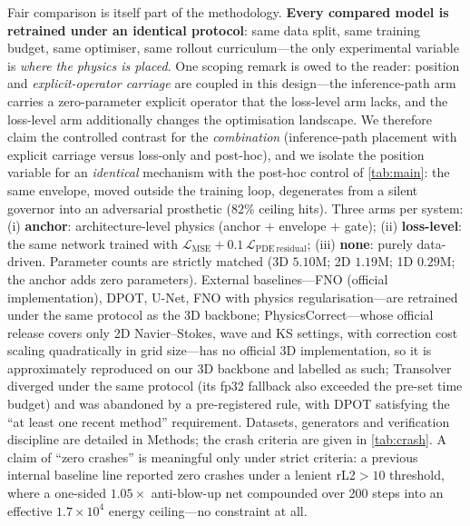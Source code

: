 \documentclass[11pt,a4paper]{article}
\begin{document}
Fair comparison is itself part of the methodology. \textbf{Every compared model is retrained under an identical protocol}: same data split, same training budget, same optimiser, same rollout curriculum---the only experimental variable is \emph{where the physics is placed}. One scoping remark is owed to the reader: position and \emph{explicit-operator carriage} are coupled in this design---the inference-path arm carries a zero-parameter explicit operator that the loss-level arm lacks, and the loss-level arm additionally changes the optimisation landscape. We therefore claim the controlled contrast for the \emph{combination} (inference-path placement with explicit carriage versus loss-only and post-hoc), and we isolate the position variable for an \emph{identical} mechanism with the post-hoc control of \ref{tab:main}: the same envelope, moved outside the training loop, degenerates from a silent governor into an adversarial prosthetic ($82\%$ ceiling hits). Three arms per system: (i) \textbf{anchor}: architecture-level physics (anchor $+$ envelope $+$ gate); (ii) \textbf{loss-level}: the same network trained with $\mathcal{L}_{\mathrm{MSE}}+0.1\,\mathcal{L}_{\mathrm{PDE\ residual}}$; (iii) \textbf{none}: purely data-driven. Parameter counts are strictly matched (3D $5.10$M; 2D $1.19$M; 1D $0.29$M; the anchor adds zero parameters). External baselines---FNO (official implementation\cite{kossaifi2024library}), DPOT\cite{hao2024dpot}, U-Net\cite{ronneberger2015}, FNO with physics regularisation---are retrained under the same protocol as the 3D backbone; PhysicsCorrect\cite{huang2025physicorrect}---whose official release covers only 2D Navier--Stokes, wave and KS settings, with correction cost scaling quadratically in grid size---has no official 3D implementation, so it is approximately reproduced on our 3D backbone and labelled as such; Transolver\cite{wu2024transolver} diverged under the same protocol (its fp32 fallback also exceeded the pre-set time budget) and was abandoned by a pre-registered rule, with DPOT satisfying the ``at least one recent method'' requirement. Datasets, generators and verification discipline are detailed in Methods; the crash criteria are given in \ref{tab:crash}. A claim of ``zero crashes'' is meaningful only under strict criteria: a previous internal baseline line reported zero crashes under a lenient rL2${}>10$ threshold, where a one-sided $1.05\times$ anti-blow-up net compounded over 200 steps into an effective $1.7\times10^{4}$ energy ceiling---no constraint at all.
\end{document}
